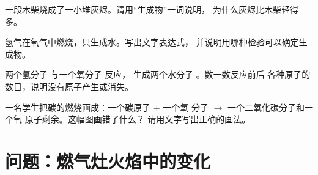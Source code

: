 \begin{exercise}[$\star\star$]\label{exo:g7:chemical-reactions:9}
一段木柴烧成了一小堆灰烬。请用“生成物”一词说明，
为什么灰烬比木柴轻得多。
\end{exercise}

\begin{exercise}[$\star\star$]\label{exo:g7:chemical-reactions:10}
氢气在氧气中燃烧，只生成水。写出文字表达式，
并说明用哪种检验可以确定生成物。
\end{exercise}

\begin{exercise}[$\star\star\star$]\label{exo:g7:chemical-reactions:11}
两个氢分子  与一个氧分子  反应，
生成两个水分子 。数一数反应前后
各种原子的数目，说明没有原子产生或消失。
\end{exercise}

\begin{exercise}[$\star\star\star$]\label{exo:g7:chemical-reactions:12}
一名学生把碳的燃烧画成：一个碳原子 $+$ 一个氧
分子 $\longrightarrow$ 一个二氧化碳分子和一个氧
原子剩余。这幅图画错了什么？
请用文字写出正确的画法。
\end{exercise}

\section{问题：燃气灶火焰中的变化}

